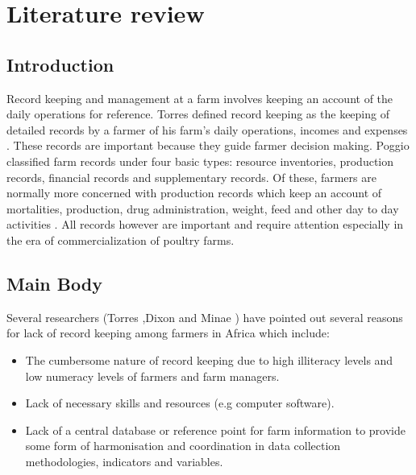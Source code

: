\documentclass{article}
\begin{document}
\section{Literature review}
\subsection{Introduction}
Record keeping and management at a farm involves keeping an account of the daily
operations for reference. Torres defined record keeping as the keeping of detailed
records by a farmer of his farm’s daily operations, incomes and expenses \cite{r2}. These records are important because they guide farmer decision making. Poggio classified farm records under four basic types: resource inventories, production records, financial records and supplementary records. Of these, farmers are normally more concerned with production
records which keep an account of mortalities, production, drug administration, weight, feed
and other day to day activities \cite{r2}. All records however are important and require
attention especially in the era of commercialization of poultry farms. 
\subsection{Main Body}
Several researchers (Torres \cite{r2},Dixon and Minae \cite{r4}) have pointed out several reasons for lack of record keeping among farmers in Africa which include:
\begin{itemize}
\item The cumbersome nature of record keeping due to high illiteracy levels and low
numeracy levels of farmers and farm managers.
\item Lack of necessary skills and resources (e.g computer software).
\item Lack of a central database or reference point for farm information to provide some
form of harmonisation and coordination in data collection methodologies, indicators
and variables.
\end{itemize}
\end{document}

